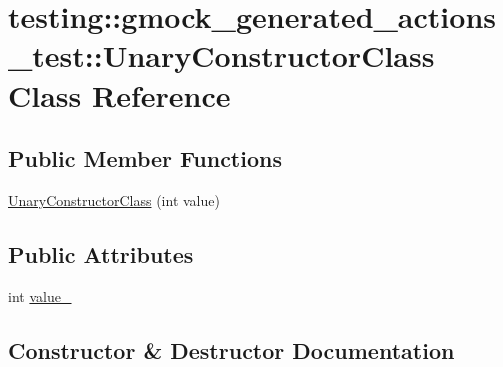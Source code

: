 \hypertarget{classtesting_1_1gmock__generated__actions__test_1_1_unary_constructor_class}{}\section{testing\+:\+:gmock\+\_\+generated\+\_\+actions\+\_\+test\+:\+:Unary\+Constructor\+Class Class Reference}
\label{classtesting_1_1gmock__generated__actions__test_1_1_unary_constructor_class}
\subsection*{Public Member Functions}
\begin{DoxyCompactItemize}
\item 
\hyperlink{classtesting_1_1gmock__generated__actions__test_1_1_unary_constructor_class_a35b2c0aab3928c1d558c11b6652a7262}{Unary\+Constructor\+Class} (int value)
\end{DoxyCompactItemize}
\subsection*{Public Attributes}
\begin{DoxyCompactItemize}
\item 
int \hyperlink{classtesting_1_1gmock__generated__actions__test_1_1_unary_constructor_class_a5e96ce337c5eb7016eba2ea66ae46851}{value\+\_\+}
\end{DoxyCompactItemize}


\subsection{Constructor \& Destructor Documentation}
\mbox{\label{classtesting_1_1gmock__generated__actions__test_1_1_unary_constructor_class_a35b2c0aab3928c1d558c11b6652a7262}} 

